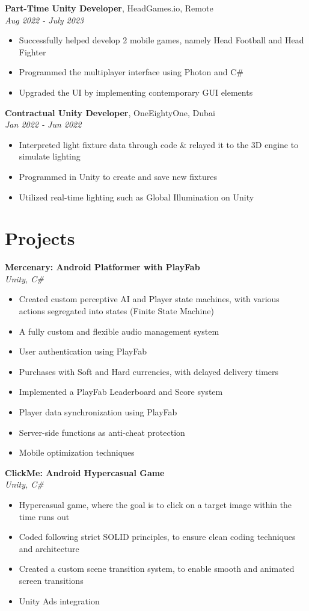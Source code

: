 \documentclass[a4paper,10pt]{article}
\begin{document}
\textbf{Part-Time Unity Developer}, HeadGames.io, Remote \\
\textit{Aug 2022 - July 2023}
\begin{itemize}
    \item Successfully helped develop 2 mobile games, namely Head Football and Head Fighter
    \item Programmed the multiplayer interface using Photon and C\#
    \item Upgraded the UI by implementing contemporary GUI elements
\end{itemize}

\textbf{Contractual Unity Developer}, OneEightyOne, Dubai \\
\textit{Jan 2022 - Jun 2022}
\begin{itemize}
    \item Interpreted light fixture data through code \& relayed it to the 3D engine to simulate lighting
    \item Programmed in Unity to create and save new fixtures
    \item Utilized real-time lighting such as Global Illumination on Unity
\end{itemize}

\section*{Projects}
\textbf{Mercenary: Android Platformer with PlayFab} \\
\textit{Unity, C\#}
\begin{itemize}
    \item Created custom perceptive AI and Player state machines, with various actions segregated into states (Finite State Machine)
    \item A fully custom and flexible audio management system
    \item User authentication using PlayFab
    \item Purchases with Soft and Hard currencies, with delayed delivery timers
    \item Implemented a PlayFab Leaderboard and Score system
    \item Player data synchronization using PlayFab
    \item Server-side functions as anti-cheat protection
    \item Mobile optimization techniques
\end{itemize}

\textbf{ClickMe: Android Hypercasual Game} \\
\textit{Unity, C\#}
\begin{itemize}
    \item Hypercasual game, where the goal is to click on a target image within the time runs out
    \item Coded following strict SOLID principles, to ensure clean coding techniques and architecture
    \item Created a custom scene transition system, to enable smooth and animated screen transitions
    \item Unity Ads integration
\end{itemize}
\end{document}
